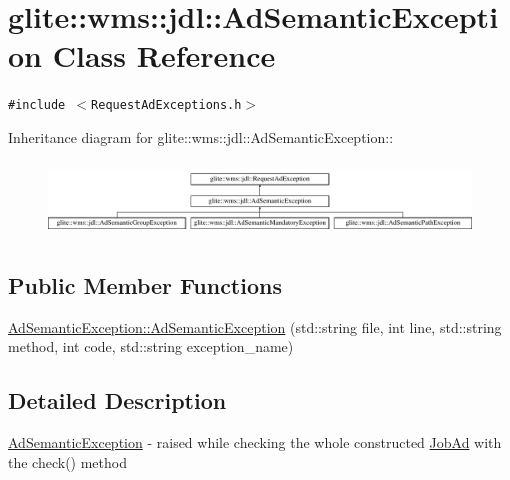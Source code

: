 \hypertarget{classglite_1_1wms_1_1jdl_1_1AdSemanticException}{
\section{glite::wms::jdl::Ad\-Semantic\-Exception Class Reference}
\label{classglite_1_1wms_1_1jdl_1_1AdSemanticException}
}
{\tt \#include $<$Request\-Ad\-Exceptions.h$>$}

Inheritance diagram for glite::wms::jdl::Ad\-Semantic\-Exception::\begin{figure}[H]
\begin{center}
\leavevmode
\includegraphics[height=1.99288cm]{classglite_1_1wms_1_1jdl_1_1AdSemanticException}
\end{center}
\end{figure}
\subsection*{Public Member Functions}
\begin{CompactItemize}
\item 
\hyperlink{classglite_1_1wms_1_1jdl_1_1AdSemanticException_a0}{Ad\-Semantic\-Exception::Ad\-Semantic\-Exception} (std::string file, int line, std::string method, int code, std::string exception\_\-name)
\end{CompactItemize}


\subsection{Detailed Description}
\hyperlink{classglite_1_1wms_1_1jdl_1_1AdSemanticException}{Ad\-Semantic\-Exception} - raised while checking the whole constructed \hyperlink{classglite_1_1wms_1_1jdl_1_1JobAd}{Job\-Ad} with the check() method 



